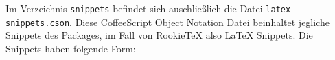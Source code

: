     Im Verzeichnis \texttt{snippets} befindet sich auschließlich die Datei \texttt{latex-snippets.cson}. Diese CoffeeScript Object Notation Datei beinhaltet jegliche Snippets des Packages, im Fall von RookieTeX also LaTeX Snippets. Die Snippets haben folgende Form:

